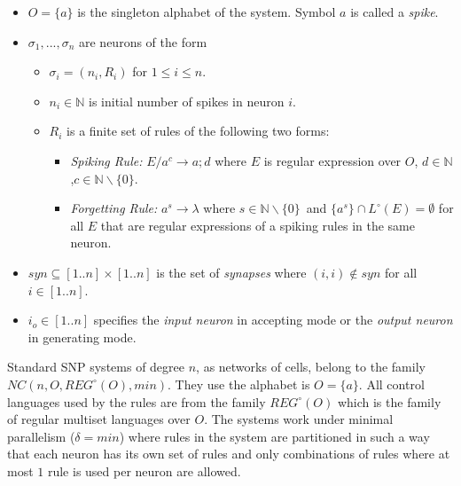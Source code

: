 \documentclass[a4paper]{article}
\theoremstyle{definition}
\newcommand{\ra}{\rightarrow}
\begin{document}
\begin{itemize}
\item $O = \{a\}$ is the singleton alphabet of the system. Symbol $a$ is called a \emph{spike}.
\item $\sigma_1,...,\sigma_n$ are neurons of the form
      \begin{itemize}
      \item $\sigma_i = (n_i, R_i)$ for $1 \leq i \leq n$. 
      \item $n_i \in \mathbb{N}$ is initial number of spikes in neuron $i$. 
      \item $R_i$ is a finite set of rules of the following two forms:
            \begin{itemize}
            \item \emph{Spiking Rule:} $E/a^c \ra a;d$ where $E$ is regular expression over $O$, 
                  $d \in \mathbb{N}$,$c \in \mathbb{N}\backslash \{0\}$.
            \item \emph{Forgetting Rule:} $a^s \ra \lambda$ where $s \in \mathbb{N}\backslash\{0\}$\
                  and $\{a^s\} \cap L^{\circ}(E) = \emptyset$ for all $E$ that are regular 
                  expressions of a spiking rules in the same neuron.
            \end{itemize}
      \end{itemize}
\item $syn \subseteq [1..n] \times [1..n]$ is the set of \emph {synapses} where $(i,i) \notin syn$ 
      for all $i \in [1..n]$.
\item $i_o \in [1..n]$ specifies the \emph{input neuron} in accepting mode or the \emph{output
      neuron} in generating mode.
\end{itemize}

Standard SNP systems of degree $n$, as networks of cells, belong to the family 
$NC(n,O,REG^{\circ}(O), min)$. They use the alphabet is $O =\{a\}$. All control languages used by 
the rules are from the family $REG^{\circ}(O)$ which is the family of regular multiset languages 
over $O$. The systems work under minimal parallelism ($\delta = min$) where rules in the system are
partitioned in such a way that each neuron has its own set of rules and only combinations of rules 
where at most $1$ rule is used per neuron are allowed.
\end{document}
